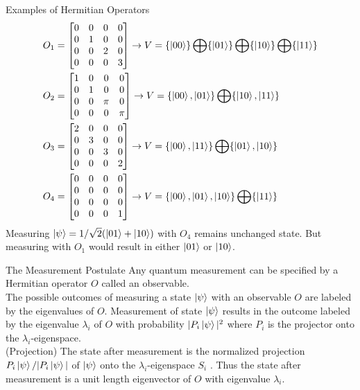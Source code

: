 \documentclass{beamer}
\begin{document}
\begin{frame}{Examples of Hermitian Operators}
  {\tiny
  \begin{align*}
    O_1 &= 
    \begin{bmatrix} 
      0 & 0 & 0 & 0 \\
      0 & 1 & 0 & 0 \\
      0 & 0 & 2 & 0 \\
      0 & 0 & 0 & 3
    \end{bmatrix}  \rightarrow
    V = \{\ket{00}\} \bigoplus \{\ket{01}\} \bigoplus \{\ket{10}\} \bigoplus \{\ket{11}\} \\
    O_2 &= 
    \begin{bmatrix} 
      1 & 0 & 0 & 0 \\
      0 & 1 & 0 & 0 \\
      0 & 0 & \pi & 0 \\
      0 & 0 & 0 & \pi 
    \end{bmatrix} \rightarrow
    V = \{\ket{00}, \ket{01}\} \bigoplus \{\ket{10}, \ket{11}\} \\
    O_3 &= 
    \begin{bmatrix} 
      2 & 0 & 0 & 0 \\
      0 & 3 & 0 & 0 \\
      0 & 0 & 3 & 0 \\
      0 & 0 & 0 & 2
    \end{bmatrix} \rightarrow
    V = \{\ket{00}, \ket{11}\} \bigoplus \{\ket{01}, \ket{10}\} \\
    O_4 &= 
    \begin{bmatrix} 
      0 & 0 & 0 & 0 \\
      0 & 0 & 0 & 0 \\
      0 & 0 & 0 & 0 \\
      0 & 0 & 0 & 1
    \end{bmatrix} \rightarrow
    V = \{\ket{00}, \ket{01}, \ket{10}\} \bigoplus \{\ket{11}\}
  \end{align*}
  Measuring $\ket{\psi} = 1/\sqrt2 (\ket{01}+\ket{10})$ with $O_4$ remains unchanged state.
  But measuring with $O_1$ would result in either $\ket{01}$ or $\ket{10}$.
  }%
\end{frame}

\begin{frame}{The Measurement Postulate}
  {\tiny
    Any quantum measurement can be specified by a Hermitian operator $O$ called an observable.\\
    The possible outcomes of measuring a state $\ket{\psi}$ with an observable $O$ are labeled by the
    eigenvalues of $O$. Measurement of state $\ket{\psi}$ results in the outcome labeled by the eigenvalue $\lambda_i$
    of $O$ with probability $|P_i\ket{\psi}|^2$ where $P_i$ is the projector onto the $\lambda_i$-eigenspace.\\
    (Projection) The state after measurement is the normalized projection $P_i\ket{\psi} / |P_i\ket{\psi}|$ of $\ket{\psi}$
    onto the $\lambda_i$-eigenspace $S_i$ . Thus the state after measurement is a unit length eigenvector of $O$ with eigenvalue $\lambda_i$.
  }%
\end{frame}
\end{document}
